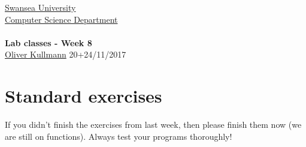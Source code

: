 \documentclass[11pt]{article}
\newcommand{\Java}{\lstset{language=Java,keywordstyle=\bfseries,breaklines,breakindent=30pt}}
\begin{document}
\begin{center}
  \href{http://www.swan.ac.uk/}{Swansea University}\\
  \href{http://www.swan.ac.uk/compsci/}{Computer Science Department}\\[1ex]
  \href{\chp}{\module}\\[1ex]
  \textbf{Lab classes - Week 8}\\
  \href{http://cs.swan.ac.uk/~csoliver}{Oliver Kullmann} 20+24/11/2017
\end{center}


\section{Standard exercises}
\label{sec:stdex}

\Java

If you didn't finish the exercises from last week, then please finish them now (we are still on functions). Always test your programs thoroughly!
\end{document}
